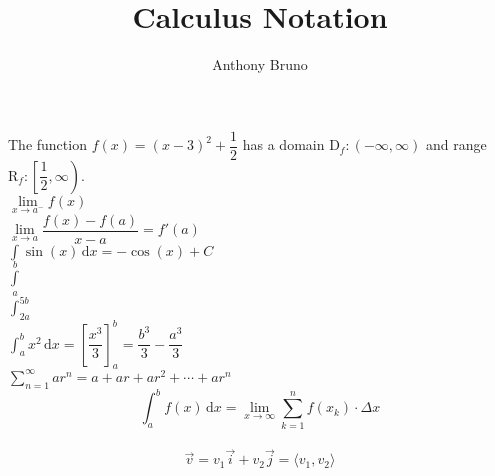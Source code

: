 \documentclass[11pt,letterpaper]{article}
\author{Anthony Bruno}
\title{Calculus Notation}
\begin{document}
\maketitle

The function $f(x)=(x-3)^2+\dfrac{1}{2}$ has a domain $\mathrm{D}_f:(-\infty,\infty)$ and range $\mathrm{R}_f:\left[\dfrac{1}{2}, \infty\right)$. \\

$\lim\limits_{x \to a^-} f(x)$\\

$\displaystyle{\lim\limits_{x \to a} \dfrac{f(x)-f(a)}{x-a}=f'(a)}$\\

$\displaystyle{\int \sin(x)\,\mathrm{d}x=-\cos(x)+C}$\\

$\displaystyle{\int \limits_a^b}$\\

$\displaystyle{\int_{2a}^{5b}}$\\

$\displaystyle{\int_{a}^{b}x^2\,\mathrm{d}x=\left[\dfrac{x^3}{3}\right]_{a}^{b}=\dfrac{b^3}{3}-\dfrac{a^3}{3}}$\\

$\displaystyle{\sum \limits_{n=1}^{\infty}ar^n=a+ar+ar^2+\cdots+ar^n}$\\


$$\displaystyle{\int_a^b f(x)\,\mathrm{d}x = \lim \limits_{x \to \infty} \sum \limits_{k=1}^{n} f(x_k) \cdot \Delta x}$$\\

$$\vec{v}=v_1 \vec{i} + v_2 \vec{j} = \langle v_1,v_2 \rangle$$
\end{document}
